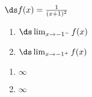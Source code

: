 {$\ds f(x) = \frac{1}{(x+1)^2}$
\begin{enumerate}
\item		$\ds \lim_{x\to -1^-} f(x)$
\item		$\ds \lim_{x\to -1^+} f(x)$
\end{enumerate}

}
{\begin{enumerate}
\item	$\infty$
\item	$\infty$
\end{enumerate}
}
